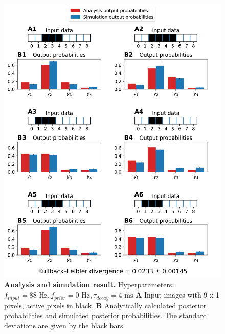 \begin{figure}
  \includegraphics[width=\linewidth]{figures/1D/1D_88_0_4.png}
   \caption{\textbf{Analysis and simulation result. } Hyperparameters: $f_{input} = 88\text{ Hz}, f_{prior} = 0\text{ Hz}, \tau_{decay} = 4\text{ ms}$ \textbf{A} Input images with 9 x 1 pixels, active pixels in black. \textbf{B} Analytically calculated posterior probabilities and simulated posterior probabilities. The standard deviations are given by the black bars.}
  \label{fig:1D_88_0_4}
\end{figure}

